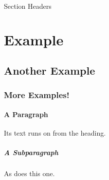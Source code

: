 \begin{ExampleBlock}{Section Headers}
\section*{Example} %
    \subsection{Another Example}
        \subsubsection{More Examples!}
            \paragraph{A Paragraph} Its text runs on from the heading.

            \subparagraph{A Subparagraph} As does this one.


\end{ExampleBlock}
